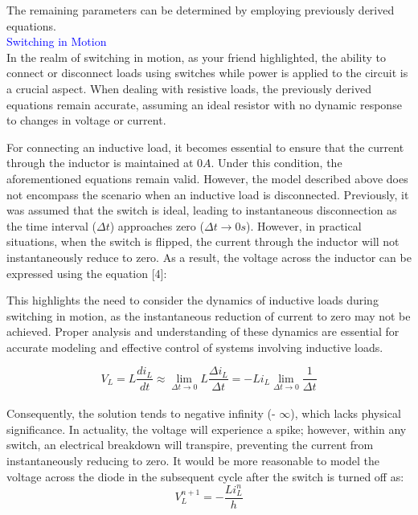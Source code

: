 The remaining parameters can be determined by employing previously derived equations.\\

\textcolor{blue}{Switching in Motion}\\

In the realm of switching in motion, as your friend highlighted, the ability to connect or disconnect loads using switches while power is applied to the circuit is a crucial aspect. When dealing with resistive loads, the previously derived equations remain accurate, assuming an ideal resistor with no dynamic response to changes in voltage or current.

For connecting an inductive load, it becomes essential to ensure that the current through the inductor is maintained at $0A$. Under this condition, the aforementioned equations remain valid. However, the model described above does not encompass the scenario when an inductive load is disconnected. Previously, it was assumed that the switch is ideal, leading to instantaneous disconnection as the time interval ($\Delta t$) approaches zero ($\Delta t \to 0s$). However, in practical situations, when the switch is flipped, the current through the inductor will not instantaneously reduce to zero. As a result, the voltage across the inductor can be expressed using the equation [4]:

This highlights the need to consider the dynamics of inductive loads during switching in motion, as the instantaneous reduction of current to zero may not be achieved. Proper analysis and understanding of these dynamics are essential for accurate modeling and effective control of systems involving inductive loads.

\begin{equation}
    V_L=L\frac{di_L}{dt} \approx \lim_{\Delta t \to 0} L\frac{\Delta i_L}{\Delta t}=-Li_L \lim_{\Delta t \to 0} \frac{1}{\Delta t}
\end{equation}\\

Consequently, the solution tends to negative infinity (- $\infty$), which lacks physical significance. In actuality, the voltage will experience a spike; however, within any switch, an electrical breakdown will transpire, preventing the current from instantaneously reducing to zero. It would be more reasonable to model the voltage across the diode in the subsequent cycle after the switch is turned off as:\\

\begin{equation}
    V^{n+1}_L = -\frac{Li^{n}_L}{h}
\end{equation}\\

